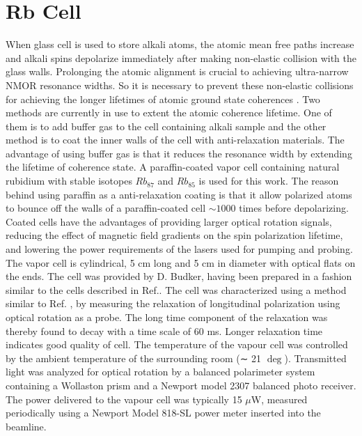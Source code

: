 \section{Rb Cell}
When glass cell is used to store alkali atoms, the atomic mean free paths increase and alkali spins depolarize immediately after making non-elastic collision with the glass walls.
Prolonging the atomic alignment is crucial to achieving ultra-narrow NMOR
resonance widths. So it is necessary to prevent these non-elastic collisions for achieving the longer lifetimes of atomic ground state coherences \cite{PhysRevA.72.023401}\cite{Balabas:10}  \cite{doi:10.1063/1.3236649}. Two methods are currently in use to extent the atomic coherence lifetime. One of them is to add buffer gas to the cell containing alkali sample and the other method is to coat the inner walls of the cell with anti-relaxation materials. The advantage of using buffer gas is that it reduces the resonance width by extending the lifetime of coherence state. A paraffin-coated vapor cell containing  natural rubidium with stable isotopes $Rb_{87}$ and $Rb_{85}$ is used for this work. The reason behind using paraffin as a anti-relaxation coating is that it allow polarized atoms to bounce off the walls of a paraffin-coated cell $\sim 1000$ times before depolarizing\cite{PhysRev.147.41}\cite{PhysRevA.72.023401}. Coated cells have the advantages of providing larger optical rotation
signals, reducing the effect of magnetic field gradients on the spin polarization lifetime,
and lowering the power requirements of the lasers used for pumping and probing. The vapor cell is cylindrical, 5 cm long and 5 cm in diameter with optical
flats on the ends. The cell was provided by D. Budker, having been prepared in
a fashion similar to the cells described in Ref.\cite{PhysRevA.72.023401}. The cell was characterized
using a method similar to Ref. \cite{PhysRevA.72.023401}, by measuring the relaxation of longitudinal
polarization using optical rotation as a probe. The long time component of the
relaxation was thereby found to decay with a time scale of 60 ms.  Longer relaxation time indicates good quality of cell. The temperature of the vapour cell was controlled by the ambient temperature of the surrounding room (∼ 21 $\deg$). Transmitted light was analyzed for optical rotation by a balanced polarimeter system containing a Wollaston prism and a Newport model 2307 balanced photo receiver. The power delivered to the vapour cell was typically 15 $\mu$W, measured periodically using a Newport Model 818-SL power meter inserted into the
beamline. 
